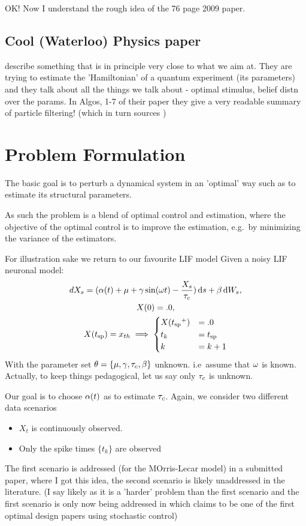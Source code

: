 OK! Now I understand the rough idea of the 76 page 2009 paper\cite{Lewi2009}.

\subsection{Cool (Waterloo) Physics paper}
\cite{Granade2012} describe something that is in principle very close to what we
aim at. They are trying to estimate the 'Hamiltonian' of a quantum experiment
(its parameters) and they talk about all the things we talk about - optimal
stimulus, belief distn over the params. In Algos, 1-7 of their paper they give a
very readable summary of particle filtering! (which in turn sources
\cite{Liu2001})

\section{Problem Formulation}
The basic goal is to perturb a dynamical system in an 'optimal' way such as to
estimate its structural parameters. 

As such the problem is a blend of optimal control and estimation, where the
objective of the optimal control is to improve the estimation, e.g.\ by
minimizing the variance of the estimators. 

For illustration sake we return to our favourite LIF model
Given a noisy LIF neuronal model:
\begin{equation}
\begin{gathered}
dX_s = (\alpha(t) + {\mu } + {\gamma } \sin({\omega} t) - \frac{X_s}{{ \tau_{c} }} ) \, \mathrm{d} s + \beta \, \mathrm{d} W_s,
\\
X(0) = .0,
\\
X({ t_{\textrm{sp} } }) = { x_{th} } \implies  
\begin{cases}
X({ t_{\textrm{sp} } }^+) &= .0   
\\
t_k &=  { t_{\textrm{sp} } }
\\
k  &= k+1
\end{cases}
\end{gathered}
\label{eq:X_evolution_uo}
\end{equation}
With the parameter set ${ \theta} = \{{\mu }, {\gamma }, { \tau_{c} }, \beta\}$ unknown. i.e\ assume that
${\omega}$ is known. Actually, to keep things pedagogical, let us say only ${ \tau_{c} }$ is
unknown.

Our goal is to choose $\alpha(t)$ as to estimate ${ \tau_{c} }$. Again, we consider two
different data scenarios
\begin{itemize}
  \item $X_t$ is continuously observed. 
	\item Only the spike times $\{t_k\}$ are observed
\end{itemize}
The first scenario is addressed (for the MOrris-Lecar model) in a submitted
paper, \cite{Lin} where I got this idea, the second scenario is likely
unaddressed in the literature. (I say likely as it is a 'harder' problem than
the first scenario and the first scenario is only now being addressed in 
\cite{Lin} which claims to be one of the first optimal design papers using
stochastic control)

